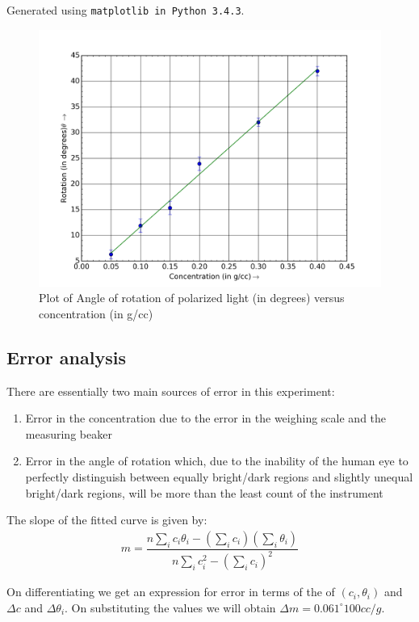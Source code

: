\documentclass{dkpinto-report}
\begin{document}
Generated using \texttt{matplotlib in Python 3.4.3}.
\begin{figure}[ht]
\centering
\includegraphics[scale=0.7]{Images/Plot.png}
\caption{Plot of Angle of rotation of polarized light (in degrees) versus concentration (in g/cc)} 
\end{figure}


\subsection{Error analysis}
There are essentially two main sources of error in this experiment:
\begin{enumerate}
\item Error in the concentration due to the error in the weighing scale and the measuring beaker
\item Error in the angle of rotation which, due to the inability of the human eye to perfectly distinguish between equally bright/dark regions and slightly unequal bright/dark regions, will be more than the least count of the instrument
\end{enumerate} 

The slope of the fitted curve is given by:
\begin{align*}
m = \dfrac{n\sum_i c_i \theta_i - (\sum_i c_i)(\sum_i \theta_i)}{n\sum_i c_{i}^{2} -  (\sum_i c_i)^2}
\end{align*}

On differentiating we get an expression for error in terms of the of $(c_i, \theta_i)$ and $\Delta c$ and $\Delta \theta_i$. On substituting the values we will obtain $\Delta m = 0.061 ^{\circ} 100 cc / g$. 
\end{document}
